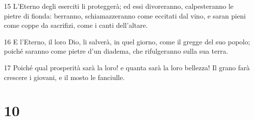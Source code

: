 \par 15 L'Eterno degli eserciti li proteggerà; ed essi divoreranno, calpesteranno le pietre di fionda: berranno, schiamazzeranno come eccitati dal vino, e saran pieni come coppe da sacrifizi, come i canti dell'altare.
\par 16 E l'Eterno, il loro Dio, li salverà, in quel giorno, come il gregge del suo popolo; poiché saranno come pietre d'un diadema, che rifulgeranno sulla sua terra.
\par 17 Poiché qual prosperità sarà la loro! e quanta sarà la loro bellezza! Il grano farà crescere i giovani, e il mosto le fanciulle.

\chapter{10}

